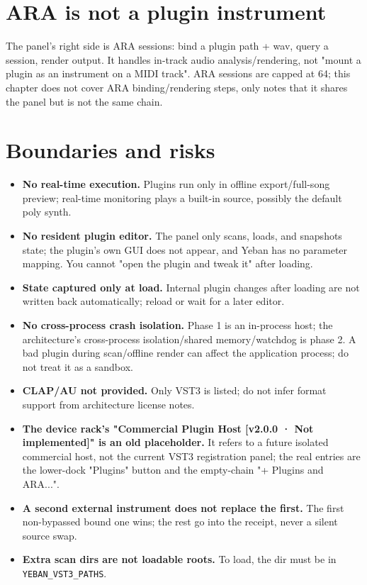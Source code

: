 
\section{ARA is not a plugin instrument}

The panel's right side is ARA sessions: bind a plugin path + wav, query a session, render output. It handles in-track audio analysis/rendering, not "mount a plugin as an instrument on a MIDI track". ARA sessions are capped at 64; this chapter does not cover ARA binding/rendering steps, only notes that it shares the panel but is not the same chain.

\section{Boundaries and risks}

\begin{itemize}
  \item \textbf{No real-time execution.} Plugins run only in offline export/full-song preview; real-time monitoring plays a built-in source, possibly the default poly synth.
  \item \textbf{No resident plugin editor.} The panel only scans, loads, and snapshots state; the plugin's own GUI does not appear, and Yeban has no parameter mapping. You cannot "open the plugin and tweak it" after loading.
  \item \textbf{State captured only at load.} Internal plugin changes after loading are not written back automatically; reload or wait for a later editor.
  \item \textbf{No cross-process crash isolation.} Phase 1 is an in-process host; the architecture's cross-process isolation/shared memory/watchdog is phase 2. A bad plugin during scan/offline render can affect the application process; do not treat it as a sandbox.
  \item \textbf{CLAP/AU not provided.} Only VST3 is listed; do not infer format support from architecture license notes.
  \item \textbf{The device rack's "Commercial Plugin Host [v2.0.0 · Not implemented]" is an old placeholder.} It refers to a future isolated commercial host, not the current VST3 registration panel; the real entries are the lower-dock "Plugins" button and the empty-chain "+ Plugins and ARA...".
  \item \textbf{A second external instrument does not replace the first.} The first non-bypassed bound one wins; the rest go into the receipt, never a silent source swap.
  \item \textbf{Extra scan dirs are not loadable roots.} To load, the dir must be in \texttt{YEBAN\_VST3\_PATHS}.
\end{itemize}

